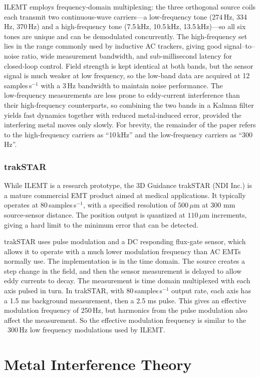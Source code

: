 \documentclass[journal,twoside,web]{ieeecolor}
\begin{document}
ILEMT employs frequency‑domain multiplexing: the three orthogonal source coils each transmit two continuous‑wave carriers---a low‑frequency tone (274\,Hz, 334\,Hz, 370\,Hz) and a high‑frequency tone (7.5\,kHz, 10.5\,kHz, 13.5\,kHz)---so all six tones are unique and can be demodulated concurrently. The high‑frequency set lies in the range commonly used by inductive AC trackers, giving good signal--to--noise ratio, wide measurement bandwidth, and sub‑millisecond latency for closed‑loop control. Field strength is kept identical at both bands, but the sensor signal is much weaker at low frequency, so the low‑band data are acquired at 12\,samples\,s$^{-1}$ with a 3\,Hz bandwidth to maintain noise performance. The low‑frequency measurements are less prone to eddy‑current interference than their high‑frequency counterparts, so combining the two bands in a Kalman filter yields fast dynamics together with reduced metal‑induced error, provided the interfering metal moves only slowly. For brevity, the remainder of the paper refers to the high‑frequency carriers as ``10\,kHz'' and the low‑frequency carriers as ``300\,Hz''.

\subsubsection{trakSTAR}
While ILEMT is a research prototype, the 3D Guidance trakSTAR (NDI Inc.) is a mature commercial EMT product aimed at medical applications. It typically operates at 80\,samples\,s$^{-1}$, with a specified resolution of $500\,\mu$m at 300 mm source-sensor distance. The position output is quantized at $110\,\mu$m increments, giving a hard limit to the minimum error that can be detected. 

 trakSTAR uses pulse modulation and a DC responding flux-gate sensor, which allows it to operate with a much lower modulation frequency than AC EMTs normally use. The implementation is in the time domain. The source creates a step change in the field, and then the sensor measurement is delayed to allow eddy currents to decay. The measurement is time domain multiplexed with each axis pulsed in turn. In trakSTAR, with 80\,samples\,s$^{-1}$ output rate, each axis has a 1.5 ms background measurement, then a 2.5 ms pulse. This gives an effective modulation frequency of 250\,Hz, but harmonics from the pulse modulation also affect the measurement. So the effective modulation frequency is similar to the ~300\,Hz low frequency modulations used by ILEMT.

\section{Metal Interference Theory}
\end{document}
